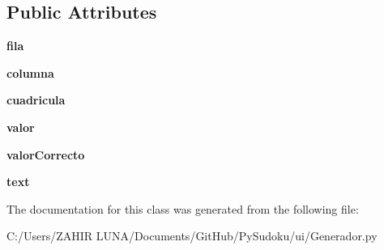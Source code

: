 \subsection*{Public Attributes}
\begin{DoxyCompactItemize}
\item 
\hypertarget{class_generador_1_1_celda_aec792452bb33327f9d956b8f83d57282}{{\bfseries fila}}\label{class_generador_1_1_celda_aec792452bb33327f9d956b8f83d57282}

\item 
\hypertarget{class_generador_1_1_celda_a90fdf3e757c913e5a31d94c134a1ba90}{{\bfseries columna}}\label{class_generador_1_1_celda_a90fdf3e757c913e5a31d94c134a1ba90}

\item 
\hypertarget{class_generador_1_1_celda_a7b0d4462edfdda325a4cf5f1c7782f2b}{{\bfseries cuadricula}}\label{class_generador_1_1_celda_a7b0d4462edfdda325a4cf5f1c7782f2b}

\item 
\hypertarget{class_generador_1_1_celda_a82d01cf51e9e9b4f9c7fb9b22fdd3b8c}{{\bfseries valor}}\label{class_generador_1_1_celda_a82d01cf51e9e9b4f9c7fb9b22fdd3b8c}

\item 
\hypertarget{class_generador_1_1_celda_afaf6c119be48af5f52790ef0b6e975fc}{{\bfseries valor\-Correcto}}\label{class_generador_1_1_celda_afaf6c119be48af5f52790ef0b6e975fc}

\item 
\hypertarget{class_generador_1_1_celda_aec979402884d639c20f1516604cf9206}{{\bfseries text}}\label{class_generador_1_1_celda_aec979402884d639c20f1516604cf9206}

\end{DoxyCompactItemize}


The documentation for this class was generated from the following file\-:\begin{DoxyCompactItemize}
\item 
C\-:/\-Users/\-Z\-A\-H\-I\-R  L\-U\-N\-A/\-Documents/\-Git\-Hub/\-Py\-Sudoku/ui/Generador.\-py\end{DoxyCompactItemize}
